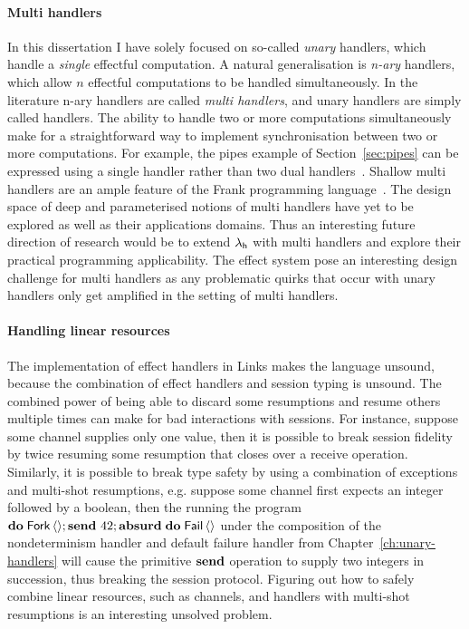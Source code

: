 \documentclass[12pt,phd,lfcs,twoside,openright,logo,leftchapter,normalheadings]{infthesis}
\theoremstyle{plain}
\theoremstyle{definition}
\begin{document}
\paragraph{Multi handlers} In this dissertation I have solely focused
on so-called \emph{unary} handlers, which handle a \emph{single}
effectful computation. A natural generalisation is \emph{n-ary}
handlers, which allow $n$ effectful computations to be handled
simultaneously. In the literature n-ary handlers are called
\emph{multi handlers}, and unary handlers are simply called
handlers. The ability to handle two or more computations
simultaneously make for a straightforward way to implement
synchronisation between two or more computations. For example, the
pipes example of Section~\ref{sec:pipes} can be expressed using a
single handler rather than two dual
handlers~\cite{LindleyMM17}. Shallow multi handlers are an ample
feature of the Frank programming language~\cite{LindleyMM17}.  The
design space of deep and parameterised notions of multi handlers have
yet to be explored as well as their applications domains. Thus an
interesting future direction of research would be to extend $\lambda_{\mathsf{h}}$
with multi handlers and explore their practical programming
applicability. The effect system pose an interesting design challenge
for multi handlers as any problematic quirks that occur with unary
handlers only get amplified in the setting of multi handlers.

\paragraph{Handling linear resources} The implementation of effect
handlers in Links makes the language unsound, because the \naive{}
combination of effect handlers and session typing is unsound. The
combined power of being able to discard some resumptions and resume
others multiple times can make for bad interactions with sessions. For
instance, suppose some channel supplies only one value, then it is
possible to break session fidelity by twice resuming some resumption
that closes over a receive operation. Similarly, it is possible to
break type safety by using a combination of exceptions and multi-shot
resumptions, e.g. suppose some channel first expects an integer
followed by a boolean, then the running the program
$\mathbf{do}\;\mathsf{Fork}\,\langle  \rangle;\mathbf{send}~42;\mathbf{absurd}\;\mathbf{do}\;\mathsf{Fail}\,\langle  \rangle$ under
the composition of the nondeterminism handler and default failure
handler from Chapter~\ref{ch:unary-handlers} will cause the primitive
$\mathbf{send}$ operation to supply two integers in succession, thus
breaking the session protocol. Figuring out how to safely combine
linear resources, such as channels, and handlers with multi-shot
resumptions is an interesting unsolved problem.
\end{document}
